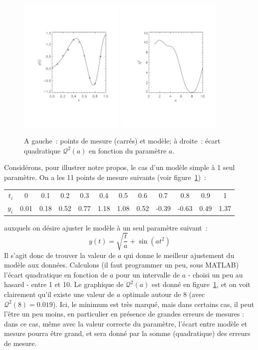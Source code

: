 \newpage
\begin{figure}[h!]
   \centering
   \includegraphics[height=6.5cm]{assets/figures/prob4.pdf}\hspace{1cm}
   \includegraphics[height=6.5cm]{assets/figures/figure2.pdf}
   \caption{A gauche~: points de mesure (carrés) et modèle; à droite~: écart quadratique $\mathcal{Q}^2(a)$ en fonction du paramètre $a$.}
   \label{fig:q2a}
\end{figure}
Considérons, pour illustrer notre propos, le cas d'un modèle simple à 1 seul paramètre. On a les 11 points de mesure suivants (voir figure~\ref{fig:q2a})~:
\begin{center}
\begin{tabular}{r|ccccccccccc}
$t_i$ & 0 & 0.1 & 0.2 & 0.3 & 0.4 & 0.5 & 0.6 & 0.7 & 0.8 & 0.9 & 1 \\
$y_i$ & 0.01 & 0.18 & 0.52 & 0.77 & 1.18 & 1.08 & 0.52 & -0.39 & -0.63 & 0.49 & 1.37
\end{tabular}
\end{center}
auxquels on désire ajuster le modèle à un seul paramètre suivant~:
$$
y(t)=\sqrt{\frac{t}{a}}+\sin{(a t^2)}
$$
Il s'agit donc de trouver la valeur de $a$ qui donne le meilleur ajustement du modèle aux données. Calculons (il faut programmer un peu, sous MATLAB) l'écart quadratique en fonction de $a$ pour un intervalle de $a$ - choisi un peu au hasard - entre 1 et 10. Le graphique de $\mathcal{Q}^2(a)$ est donné en figure~\ref{fig:q2a}, et on voit clairement qu'il existe une valeur de $a$ optimale autour de 8 (avec $\mathcal{Q}^2(8)=0.019$). Ici, le minimum est très marqué, mais dans certains cas, il peut l'être un peu moins, en particulier en présence de grandes erreurs de mesures : dans ce cas, même avec la valeur correcte du paramètre, l'écart entre modèle et mesure pourra être grand, et sera donné par la somme (quadratique) des erreurs de mesure.

